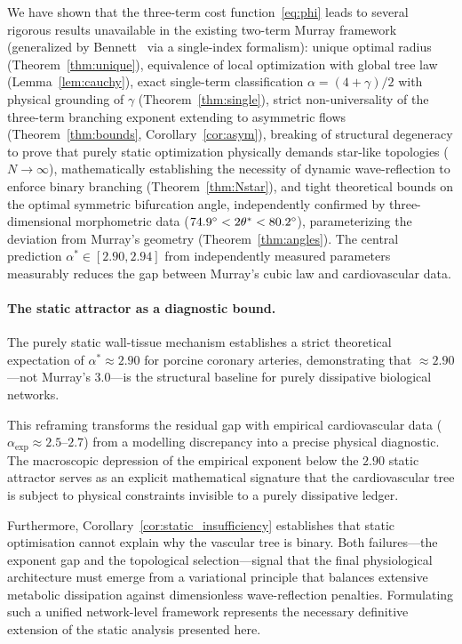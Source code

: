 \documentclass[11pt,a4paper]{article}
\theoremstyle{remark}
\begin{document}
We have shown that the three-term cost function~\eqref{eq:phi} leads to
several rigorous results unavailable in the existing two-term Murray framework
(generalized by Bennett~\cite{bennett2025} via a single-index
formalism):
unique optimal radius (Theorem~\ref{thm:unique}),
equivalence of local optimization with global tree law (Lemma~\ref{lem:cauchy}),
exact single-term classification $\alpha=(4+\gamma)/2$ with physical grounding
of $\gamma$ (Theorem~\ref{thm:single}),
strict non-universality of the three-term branching exponent extending to
asymmetric flows
(Theorem~\ref{thm:bounds}, Corollary~\ref{cor:asym}),
breaking of structural degeneracy to prove that purely static optimization
physically demands star-like topologies ($N \to \infty$), mathematically
establishing the necessity of dynamic wave-reflection to enforce binary
branching (Theorem~\ref{thm:Nstar}),
and tight theoretical bounds on the optimal symmetric bifurcation angle,
independently confirmed by three-dimensional morphometric data
($74.9^\circ < 2\theta^* < 80.2^\circ$), parameterizing
the deviation from Murray's geometry (Theorem~\ref{thm:angles}).
The central prediction $\alpha^*\in[2.90,2.94]$ from independently measured
parameters
measurably reduces the gap between Murray's cubic law and cardiovascular data.

\paragraph{The static attractor as a diagnostic bound.}
The purely static wall-tissue mechanism establishes a strict theoretical
expectation of $\alpha^* \approx 2.90$ for porcine coronary arteries,
demonstrating that $\approx 2.90$---not Murray's $3.0$---is the
structural baseline for purely dissipative biological networks.

This reframing transforms the residual gap with empirical cardiovascular
data ($\alpha_{\exp} \approx 2.5$--$2.7$) from a modelling discrepancy
into a precise physical diagnostic. The macroscopic depression of the
empirical exponent below the $2.90$ static attractor serves as an
explicit mathematical signature that the cardiovascular tree is subject
to physical constraints invisible to a purely dissipative ledger.

Furthermore, Corollary~\ref{cor:static_insufficiency} establishes that
static optimisation cannot explain why the vascular tree is binary.
Both failures---the exponent gap and the topological selection---signal
that the final physiological architecture must emerge from a variational
principle that balances extensive metabolic dissipation against
dimensionless wave-reflection penalties. Formulating such a unified
network-level framework represents the necessary definitive extension
of the static analysis presented here.
\end{document}
